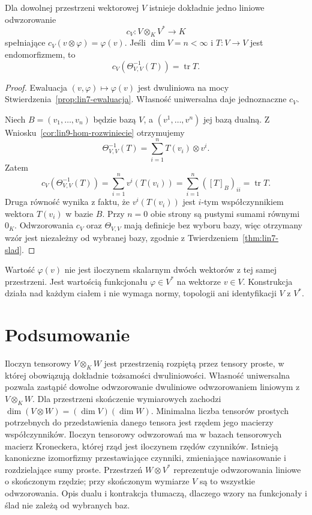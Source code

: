 \begin{twierdzenie}
\label{thm:lin9-kontrakcja}
Dla dowolnej przestrzeni
wektorowej \(V\) istnieje
dokładnie jedno liniowe
odwzorowanie
\[
 c_V\colon V\otimes_KV^*\to K
\]
spełniające
\(c_V(v\otimes\varphi)=\varphi(v)\).
Jeśli \(\dim V=n<\infty\)
i \(T\colon V\to V\)
jest endomorfizmem, to
\[
 c_V(\Theta_{V,V}^{-1}(T))
 =\operatorname{tr}T.
\]
\end{twierdzenie}
\begin{proof}
Ewaluacja
\((v,\varphi)\mapsto\varphi(v)\)
jest dwuliniowa na mocy
Stwierdzenia~\ref{prop:lin7-ewaluacja}.
Własność uniwersalna
daje jednoznaczne \(c_V\).

Niech \(B=(v_1,\ldots,v_n)\)
będzie bazą \(V\),
a \((v^1,\ldots,v^n)\)
jej bazą dualną.
Z
Wniosku~\ref{cor:lin9-hom-rozwiniecie}
otrzymujemy
\[
 \Theta_{V,V}^{-1}(T)
 =\sum_{i=1}^n T(v_i)\otimes v^i.
\]
Zatem
\[
 c_V(\Theta_{V,V}^{-1}(T))
 =\sum_{i=1}^n v^i(T(v_i))
 =\sum_{i=1}^n ([T]_B)_{ii}
 =\operatorname{tr}T.
\]
Druga równość wynika z faktu,
że \(v^i(T(v_i))\) jest
\(i\)-tym współczynnikiem
wektora \(T(v_i)\) w bazie \(B\).
Przy \(n=0\) obie strony
są pustymi sumami równymi \(0_K\).
Odwzorowania \(c_V\) oraz
\(\Theta_{V,V}\) mają definicje
bez wyboru bazy, więc
otrzymany wzór jest niezależny
od wybranej bazy, zgodnie
z
Twierdzeniem~\ref{thm:lin7-slad}.
\end{proof}

\begin{uwaga}
\label{rem:lin9-ewaluacja}
Wartość \(\varphi(v)\)
nie jest iloczynem skalarnym
dwóch wektorów z tej samej
przestrzeni. Jest wartością
funkcjonału \(\varphi\in V^*\)
na wektorze \(v\in V\).
Konstrukcja działa nad każdym
ciałem i nie wymaga normy,
topologii ani identyfikacji
\(V\) z \(V^*\).
\end{uwaga}

\section{Podsumowanie}
\label{sec:lin9-podsumowanie}

Iloczyn tensorowy \(V\otimes_KW\)
jest przestrzenią rozpiętą
przez tensory proste, w której
obowiązują dokładnie tożsamości
dwuliniowości.
Własność uniwersalna pozwala
zastąpić dowolne odwzorowanie
dwuliniowe odwzorowaniem liniowym
z \(V\otimes_KW\).
Dla przestrzeni skończenie
wymiarowych zachodzi
\(\dim(V\otimes W)
 =(\dim V)(\dim W)\).
Minimalna liczba tensorów prostych
potrzebnych do przedstawienia
danego tensora jest rzędem
jego macierzy współczynników.
Iloczyn tensorowy odwzorowań
ma w bazach tensorowych macierz
Kroneckera, której rząd jest
iloczynem rzędów czynników.
Istnieją kanoniczne izomorfizmy
przestawiające czynniki,
zmieniające nawiasowanie
i rozdzielające sumy proste.
Przestrzeń \(W\otimes V^*\)
reprezentuje odwzorowania
liniowe o skończonym rzędzie;
przy skończonym wymiarze \(V\)
są to wszystkie odwzorowania.
Opis dualu i kontrakcja
tłumaczą, dlaczego wzory
na funkcjonały i ślad
nie zależą od wybranych baz.
